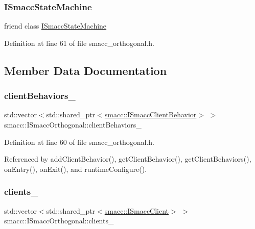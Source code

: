 \subsubsection{\texorpdfstring{I\+Smacc\+State\+Machine}{ISmaccStateMachine}}
{\footnotesize\ttfamily friend class \hyperlink{classsmacc_1_1ISmaccStateMachine}{I\+Smacc\+State\+Machine}\hspace{0.3cm}{\ttfamily [friend]}}



Definition at line 61 of file smacc\+\_\+orthogonal.\+h.



\subsection{Member Data Documentation}
\mbox{\label{classsmacc_1_1ISmaccOrthogonal_a02df51ab34a478841c54cbbba1b161c3}} 
\subsubsection{\texorpdfstring{client\+Behaviors\+\_\+}{clientBehaviors\_}}
{\footnotesize\ttfamily std\+::vector$<$std\+::shared\+\_\+ptr$<$\hyperlink{classsmacc_1_1ISmaccClientBehavior}{smacc\+::\+I\+Smacc\+Client\+Behavior}$>$ $>$ smacc\+::\+I\+Smacc\+Orthogonal\+::client\+Behaviors\+\_\+\hspace{0.3cm}{\ttfamily [private]}}



Definition at line 60 of file smacc\+\_\+orthogonal.\+h.



Referenced by add\+Client\+Behavior(), get\+Client\+Behavior(), get\+Client\+Behaviors(), on\+Entry(), on\+Exit(), and runtime\+Configure().

\mbox{\label{classsmacc_1_1ISmaccOrthogonal_a0f270e9c8c126198f6bce542ab4e04ba}} 
\subsubsection{\texorpdfstring{clients\+\_\+}{clients\_}}
{\footnotesize\ttfamily std\+::vector$<$std\+::shared\+\_\+ptr$<$\hyperlink{classsmacc_1_1ISmaccClient}{smacc\+::\+I\+Smacc\+Client}$>$ $>$ smacc\+::\+I\+Smacc\+Orthogonal\+::clients\+\_\+\hspace{0.3cm}{\ttfamily [protected]}}



